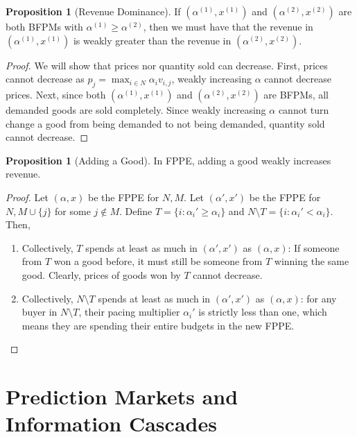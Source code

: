 \documentclass[dvipsnames]{article}
\theoremstyle{definition}
\newtheorem{proposition}[definition]{Proposition}
\theoremstyle{remark}
\begin{document}
\begin{proposition}[Revenue Dominance]
	If $(\alpha^{(1)},x^{(1)})$ and $(\alpha^{(2)},x^{(2)})$ are both BFPMs with $\alpha^{(1)} \geq \alpha^{(2)}$, then we must have that the revenue in $(\alpha^{(1)},x^{(1)})$ is weakly greater than the revenue in $(\alpha^{(2)},x^{(2)})$.
\end{proposition}

\begin{proof}
	We will show that prices nor quantity sold can decrease. First, prices cannot decrease as $p_j = \max_{i \in N} \alpha_i v_{i,j}$, weakly increasing $\alpha$ cannot decrease prices. Next, since both $(\alpha^{(1)},x^{(1)})$ and $(\alpha^{(2)},x^{(2)})$ are  BFPMs, all demanded goods are sold completely. Since weakly increasing $\alpha$ cannot turn change a good from being demanded to not being demanded, quantity sold cannot decrease.
\end{proof}

\begin{proposition}[Adding a Good]
	In FPPE, adding a good weakly increases revenue.
\end{proposition}

\begin{proof}
	Let $(\alpha,x)$ be the FPPE for $N,M$. Let $(\alpha',x')$ be the FPPE for $N, M \cup \{j\}$ for some $j \notin M$. Define $T = \{i: \alpha_i' \geq \alpha_i\}$ and $N \setminus T = \{i: \alpha_i' < \alpha_i\}$. Then,
	\begin{enumerate}
		\item Collectively, $T$ spends at least as much in $(\alpha',x')$ as $(\alpha,x)$: If someone from $T$ won a good before, it must still be someone from $T$ winning the same good. Clearly, prices of goods won by $T$ cannot decrease. 
		\item Collectively, $N \setminus T$ spends at least as much in $(\alpha',x')$ as $(\alpha,x)$: for any buyer in $N \setminus T$, their pacing multiplier $\alpha_i'$ is strictly less than one, which means they are spending their entire budgets in the new FPPE.
	\end{enumerate}
\end{proof}

\newpage

\section{Prediction Markets and Information Cascades}
\end{document}
